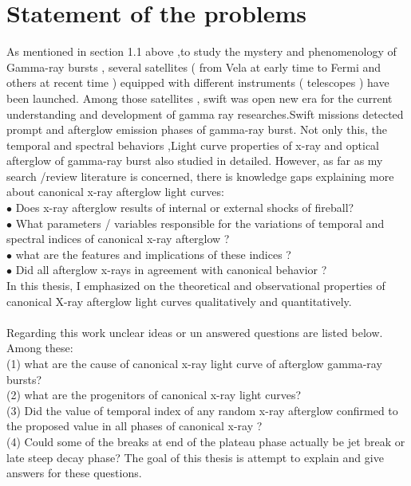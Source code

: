 \section{Statement of the problems}
As mentioned in section 1.1 above ,to study the mystery and  phenomenology of Gamma-ray bursts , several  satellites ( from Vela at early time  to  Fermi and others at recent time ) equipped  with different instruments ( telescopes ) have been launched. Among those satellites , swift was open new era  for the current understanding and development of gamma ray researches.Swift missions  detected  prompt and  afterglow emission phases of gamma-ray burst. Not only this, the  temporal and spectral behaviors ,Light curve  properties of x-ray and optical afterglow of  gamma-ray burst also studied in detailed. However, as far as my search /review literature is concerned, there is  knowledge gaps  explaining more about canonical x-ray afterglow light curves:\\
$\bullet$ Does x-ray afterglow results of internal or external shocks of fireball?  \\
$\bullet$ What parameters / variables responsible for the variations of temporal and spectral indices  of canonical x-ray afterglow ?\\
$\bullet$ what are  the features  and   implications  of  these indices ? \\
$\bullet$ Did all afterglow  x-rays in  agreement with canonical behavior ? \\ 
In this thesis, I emphasized on the theoretical and observational properties of canonical X-ray afterglow light curves  qualitatively and quantitatively.\\\\
Regarding this  work  unclear ideas or un answered questions are listed below. Among these:\\
(1) what are the cause of canonical x-ray light curve of afterglow gamma-ray bursts?\\
(2) what are the progenitors of canonical x-ray light curves?\\
(3) Did the  value  of temporal index  of any random  x-ray afterglow  confirmed to the proposed value in all phases of canonical x-ray ?\\
(4) Could some of the breaks at  end of the plateau phase actually be jet break or late steep decay phase? The goal of this thesis is  attempt to explain and give answers for these questions.
